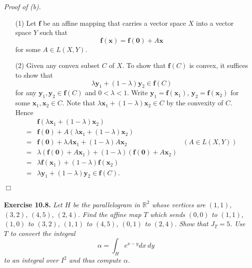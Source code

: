 \documentclass{article}
\begin{document}
\emph{Proof of (b).}
\begin{enumerate}
\item[(1)]
  Let $\mathbf{f}$ be an affine mapping that carries a vector space $X$ into a vector space $Y$
  such that
  \[
    \mathbf{f}(\mathbf{x}) = \mathbf{f}(\mathbf{0}) + A\mathbf{x}
  \]
  for some $A \in L(X,Y)$.

\item[(2)]
  Given any convex subset $C$ of $X$.
  To show that $\mathbf{f}(C)$ is convex, it suffices to show that
  \[
    \lambda \mathbf{y}_1 + (1-\lambda) \mathbf{y}_2 \in \mathbf{f}(C)
  \]
  for any $\mathbf{y}_1, \mathbf{y}_2 \in \mathbf{f}(C)$ and $0 < \lambda < 1$.
  Write $\mathbf{y}_1 = \mathbf{f}(\mathbf{x}_1)$,
  $\mathbf{y}_2 = \mathbf{f}(\mathbf{x}_2)$ for some $\mathbf{x}_1, \mathbf{x}_2 \in C$.
  Note that $\lambda \mathbf{x}_1 + (1-\lambda) \mathbf{x}_2 \in C$ by the convexity of $C$.
  Hence
  \begin{align*}
    &\mathbf{f}(\lambda\mathbf{x}_1 + (1-\lambda) \mathbf{x}_2) \\
    =& \mathbf{f}(\mathbf{0}) + A(\lambda\mathbf{x}_1 + (1-\lambda) \mathbf{x}_2) \\
    =& \mathbf{f}(\mathbf{0}) + \lambda A\mathbf{x}_1 + (1-\lambda) A\mathbf{x}_2
      &(A \in L(X,Y)) \\
    =& \lambda(\mathbf{f}(\mathbf{0}) + A\mathbf{x}_1)
      + (1-\lambda)(\mathbf{f}(\mathbf{0}) + A\mathbf{x}_2) \\
    =& \lambda \mathbf{f}(\mathbf{x}_1) + (1-\lambda)\mathbf{f}(\mathbf{x}_2) \\
    =& \lambda \mathbf{y}_1 + (1-\lambda)\mathbf{y}_2 \in \mathbf{f}(C).
  \end{align*}

\end{enumerate}
$\Box$ \\\\






\textbf{Exercise 10.8.}
\emph{Let $H$ be the parallelogram in $\mathbb{R}^2$ whose vertices are
$(1,1)$, $(3,2)$, $(4,5)$, $(2,4)$.
Find the affine map $T$ which sends
$(0,0)$ to $(1,1)$, $(1,0)$ to $(3,2)$, $(1,1)$ to $(4,5)$, $(0,1)$ to $(2,4)$.
Show that $J_{T} = 5$.
Use $T$ to convert the integral
\[
  \alpha = \int_{H} e^{x-y} dx \: dy
\]
to an integral over $I^2$ and thus compute $\alpha$.} \\
\end{document}
